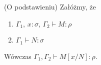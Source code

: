 
\begin{lemat}(O podstawieniu)\label{thm:substitution}
  Załóżmy, że
  \begin{enumerate}[label=(\alph*)]
    \setlength\itemsep{0em}
    \item \(\Gamma_1,\,x:\sigma,\,\Gamma_2\vdash M:\rho\) 
    \item \(\Gamma_1\vdash N:\sigma\)
  \end{enumerate}
  Wówczas \(\Gamma_1,\Gamma_2 \vdash M[x/N]:\rho\).
\end{lemat}
